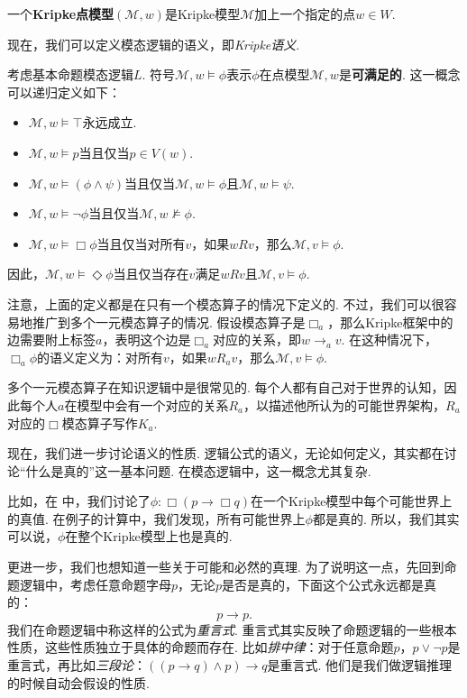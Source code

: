 \begin{definition}[Kripke点模型]
一个\textbf{Kripke点模型}$(\mathcal{M},w)$是Kripke模型$\mathcal M$加上一个指定的点$w\in W$. 
\end{definition}

现在，我们可以定义模态逻辑的语义，即\textit{Kripke语义}. 

\begin{definition}[Kripke语义]
考虑基本命题模态逻辑$L$. 符号$\mathcal M,w\vDash\phi$表示$\phi$在点模型$\mathcal M,w$是\textbf{可满足的}. 这一概念可以递归定义如下：
\begin{itemize}
\item $\mathcal M, w\vDash\top$永远成立. 
\item $\mathcal M, w\vDash p$当且仅当$p\in V(w)$. 
\item $\mathcal M, w\vDash (\phi\wedge\psi)$当且仅当$\mathcal M,w\vDash\phi$且$\mathcal M,w\vDash\psi$. 
\item $\mathcal M, w\vDash \neg\phi$当且仅当$\mathcal M,w\not\vDash\phi$. 
\item $\mathcal M, w\vDash \Box\phi$当且仅当对所有$v$，如果$wRv$，那么$\mathcal M,v\vDash\phi$. 
\end{itemize}
因此，$\mathcal M, w\vDash \Diamond\phi$当且仅当存在$v$满足$wRv$且$\mathcal M,v\vDash\phi$. 
\end{definition}

注意，上面的定义都是在只有一个模态算子的情况下定义的. 不过，我们可以很容易地推广到多个一元模态算子的情况. 假设模态算子是$\Box_a$，那么Kripke框架中的边需要附上标签$a$，表明这个边是$\Box_a$对应的关系，即$w\to_a v$. 在这种情况下，$\Box_a\phi$的语义定义为：对所有$v$，如果$wR_av$，那么$\mathcal M,v\vDash\phi$. 

多个一元模态算子在知识逻辑中是很常见的. 每个人都有自己对于世界的认知，因此每个人$a$在模型中会有一个对应的关系$R_a$，以描述他所认为的可能世界架构，$R_a$对应的$\Box$模态算子写作$K_a$. 

现在，我们进一步讨论语义的性质. 逻辑公式的语义，无论如何定义，其实都在讨论“什么是真的”这一基本问题. 在模态逻辑中，这一概念尤其复杂. 

比如，在 中，我们讨论了$\phi:\Box (p\to\Box q)$在一个Kripke模型中每个可能世界上的真值. 在例子的计算中，我们发现，所有可能世界上$\phi$都是真的. 所以，我们其实可以说，$\phi$在整个Kripke模型上也是真的. 

更进一步，我们也想知道一些关于可能和必然的真理. 为了说明这一点，先回到命题逻辑中，考虑任意命题字母$p$，无论$p$是否是真的，下面这个公式永远都是真的：
\[p\to p.\]
我们在命题逻辑中称这样的公式为\textit{重言式}. 重言式其实反映了命题逻辑的一些根本性质，这些性质独立于具体的命题而存在. 比如\textit{排中律}：对于任意命题$p$，$p\vee\neg p$是重言式，再比如\textit{三段论}：$((p\to q)\wedge p)\to q$是重言式. 他们是我们做逻辑推理的时候自动会假设的性质. 

